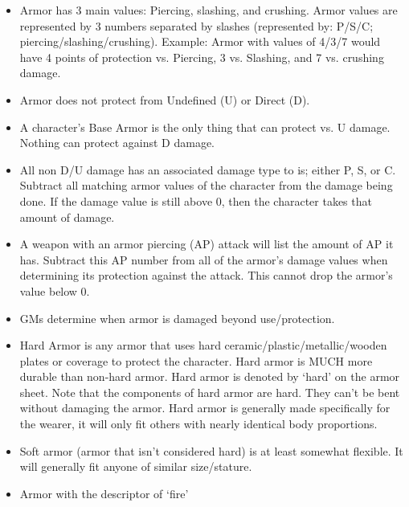 \documentclass[twoside]{book}
\begin{document}
\begin{itemize}
      
  \item   Armor has 3 main values: Piercing, slashing, and
                 crushing. Armor values are represented by 3 numbers
                 separated by slashes (represented by: P/S/C;
                 piercing/slashing/crushing). Example: Armor with values
                 of 4/3/7 would have 4 points of protection vs. Piercing,
                 3 vs. Slashing, and 7 vs. crushing damage. 
  \item   Armor does not protect from Undefined (U) or
                 Direct (D). 
  \item   A character's Base Armor is the only thing
                 that can protect vs. U damage. Nothing can protect
                 against D damage. 
  \item   All non D/U damage has an associated damage type
                 to is; either P, S, or C. Subtract all matching armor
                 values of the character from the damage being done. If
                 the damage value is still above 0, then the character
                 takes that amount of damage. 
  \item   A weapon with an armor piercing (AP) attack will
                 list the amount of AP it has. Subtract this AP number
                 from all of the armor's damage values when
                 determining its protection against the attack. This
                 cannot drop the armor's value below 0. 
  \item   GMs determine when armor is damaged beyond
                 use/protection. 
  \item   Hard Armor is any armor that uses hard
                 ceramic/plastic/metallic/wooden plates or coverage to
                 protect the character. Hard armor is MUCH more durable
                 than non-hard armor. Hard armor is denoted by
                 `hard' on the armor sheet. Note that the
                 components of hard armor are hard. They can't be
                 bent without damaging the armor. Hard armor is generally
                 made specifically for the wearer, it will only fit
                 others with nearly identical body proportions. 
  \item   Soft armor (armor that isn't considered
                 hard) is at least somewhat flexible. It will generally
                 fit anyone of similar size/stature. 
  \item   Armor with the descriptor of `fire'

\end{itemize}
\end{document}

